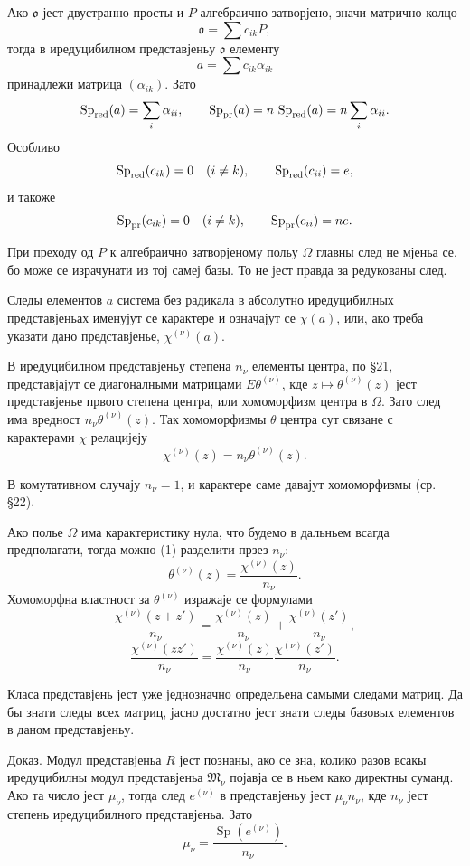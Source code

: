 ﻿\documentclass[11pt]{article}
\providecommand{\mo}{\mathfrak{o}}
\providecommand{\mM}{\mathfrak{M}}
\begin{document}
Ако $\mo$ јест двустранно просты и $P$ алгебраично затворјено, значи матрично колцо
\[
        \mo=\sum c_{ik}P,
\]
тогда в иредуцибилном представјеньу $\mo$ елементу
\[
        a=\sum c_{ik}\alpha_{ik}
\]
принадлежи матрица $(\alpha_{ik})$. Зато
\[
        \operatorname{Sp}_{\rm red}(a)=\sum_i\alpha_{ii},
        \qquad
        \operatorname{Sp}_{\rm pr}(a)=n\,\operatorname{Sp}_{\rm red}(a)=n\sum_i\alpha_{ii}.
\]
Особливо
\[
        \operatorname{Sp}_{\rm red}(c_{ik})=0\quad(i\ne k),\qquad
        \operatorname{Sp}_{\rm red}(c_{ii})=e,
\]
и такоже
\[
        \operatorname{Sp}_{\rm pr}(c_{ik})=0\quad(i\ne k),\qquad
        \operatorname{Sp}_{\rm pr}(c_{ii})=n e.
\]

При преходу од $P$ к алгебраично затворјеному польу $\Omega$ главны след не мјеньа се, бо може се израчунати из тој самеј базы. То не јест правда за редукованы след.

Следы елементов $a$ система без радикала в абсолутно иредуцибилных представјеньах именујут се карактере и означајут се $\chi(a)$, или, ако треба указати дано представјенье, $\chi^{(\nu)}(a)$.

В иредуцибилном представјеньу степена $n_\nu$ елементы центра, по §21, представјајут се диагоналными матрицами $E\theta^{(\nu)}$, кде $z\mapsto\theta^{(\nu)}(z)$ јест представјенье првого степена центра, или хомоморфизм центра в $\Omega$. Зато след има вредност $n_\nu\theta^{(\nu)}(z)$. Так хомоморфизмы $\theta$ центра сут связане с карактерами $\chi$ релацијеју
\[
        \chi^{(\nu)}(z)=n_\nu\theta^{(\nu)}(z).                \tag{1}
\]

В комутативном случају $n_\nu=1$, и карактере саме давајут хомоморфизмы (ср. §22).

Ако полье $\Omega$ има карактеристику нула, что будемо в дальньем всагда предполагати, тогда можно (1) разделити прзез $n_\nu$:
\[
        \theta^{(\nu)}(z)=\frac{\chi^{(\nu)}(z)}{n_\nu}.
\]
Хомоморфна властност за $\theta^{(\nu)}$ изражаје се формулами
\[
        \frac{\chi^{(\nu)}(z+z')}{n_\nu}
        =
        \frac{\chi^{(\nu)}(z)}{n_\nu}
        +
        \frac{\chi^{(\nu)}(z')}{n_\nu},
\]
\[
        \frac{\chi^{(\nu)}(zz')}{n_\nu}
        =
        \frac{\chi^{(\nu)}(z)}{n_\nu}
        \frac{\chi^{(\nu)}(z')}{n_\nu}.
\]

Класа представјень јест уже једнозначно определьена самыми следами матриц. Да бы знати следы всех матриц, јасно достатно јест знати следы базовых елементов в даном представјеньу.

Доказ. Модул представјеньа $R$ јест познаны, ако се зна, колико разов всакы иредуцибилны модул представјеньа $\mM_\nu$ појавја се в ньем како директны суманд. Ако та число јест $\mu_\nu$, тогда след $e^{(\nu)}$ в представјеньу јест $\mu_\nu n_\nu$, кде $n_\nu$ јест степень иредуцибилного представјеньа. Зато
\[
        \mu_\nu=\frac{\operatorname{Sp}(e^{(\nu)})}{n_\nu}.
\]
\end{document}
